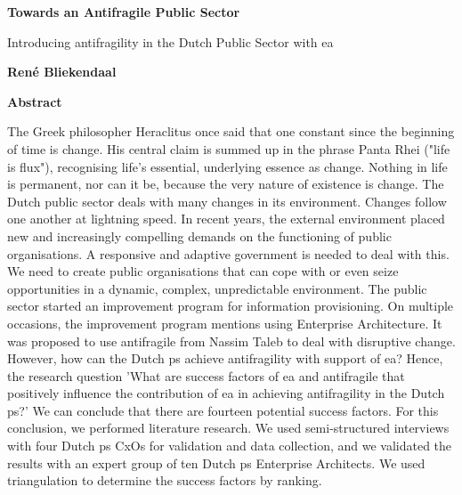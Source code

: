 \thispagestyle{plain}
{}
\begin{center}
	\Large
	\textbf{Towards an Antifragile Public Sector}
	
	\vspace{0.4cm}
	\large
	Introducing \Gls{antifragility} in the Dutch Public Sector with \gls{ea}
	
	\vspace{0.4cm}
	\textbf{René Bliekendaal}
	
	\vspace{0.9cm}
	\textbf{Abstract}
\end{center}

\small \noindent The Greek philosopher Heraclitus once said that one constant since the beginning of time is change. His central claim is summed up in the phrase Panta Rhei ("life is flux"), recognising life's essential, underlying essence as change. Nothing in life is permanent, nor can it be, because the very nature of existence is change. The Dutch public sector deals with many changes in its environment. Changes follow one another at lightning speed. In recent years, the external environment placed new and increasingly compelling demands on the functioning of public organisations. A responsive and adaptive government is needed to deal with this. We need to create public organisations that can cope with or even seize opportunities in a dynamic, complex, unpredictable environment. The public sector started an improvement program for information provisioning. On multiple occasions, the improvement program mentions using Enterprise Architecture. It was proposed to use \gls{antifragile} from Nassim Taleb to deal with disruptive change. However, how can the Dutch \gls{ps} achieve \gls{antifragility} with support of \gls{ea}? Hence, the research question 'What are success factors of \gls{ea} and \gls{antifragile} that positively influence the contribution of \gls{ea} in achieving \gls{antifragility} in the Dutch \gls{ps}?' We can conclude that there are fourteen potential success factors. For this conclusion, we performed literature research. We used semi-structured interviews with four Dutch \gls{ps} CxOs for validation and data collection, and we validated the results with an expert group of ten Dutch \gls{ps} Enterprise Architects. We used triangulation to determine the success factors by ranking.